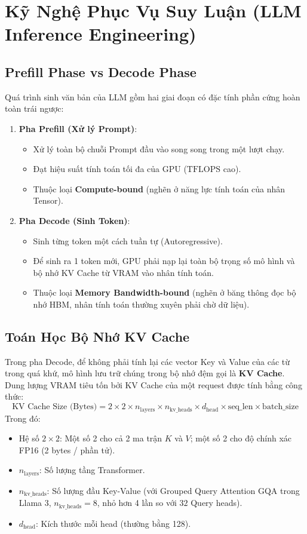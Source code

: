 \section{Kỹ Nghệ Phục Vụ Suy Luận (LLM Inference Engineering)}

\subsection{Prefill Phase vs Decode Phase}
Quá trình sinh văn bản của LLM gồm hai giai đoạn có đặc tính phần cứng hoàn toàn trái ngược:
\begin{enumerate}
    \item \textbf{Pha Prefill (Xử lý Prompt)}:
    \begin{itemize}
        \item Xử lý toàn bộ chuỗi Prompt đầu vào song song trong một lượt chạy.
        \item Đạt hiệu suất tính toán tối đa của GPU ($\text{TFLOPS}$ cao).
        \item Thuộc loại \textbf{Compute-bound} (nghẽn ở năng lực tính toán của nhân Tensor).
    \end{itemize}
    \item \textbf{Pha Decode (Sinh Token)}:
    \begin{itemize}
        \item Sinh từng token một cách tuần tự (Autoregressive).
        \item Để sinh ra 1 token mới, GPU phải nạp lại toàn bộ trọng số mô hình và bộ nhớ KV Cache từ VRAM vào nhân tính toán.
        \item Thuộc loại \textbf{Memory Bandwidth-bound} (nghẽn ở băng thông đọc bộ nhớ HBM, nhân tính toán thường xuyên phải chờ dữ liệu).
    \end{itemize}
\end{enumerate}

\subsection{Toán Học Bộ Nhớ KV Cache}
Trong pha Decode, để không phải tính lại các vector Key và Value của các từ trong quá khứ, mô hình lưu trữ chúng trong bộ nhớ đệm gọi là \textbf{KV Cache}.
Dung lượng VRAM tiêu tốn bởi KV Cache của một request được tính bằng công thức:
\begin{equation}
\text{KV Cache Size (Bytes)} = 2 \times 2 \times n_{\text{layers}} \times n_{\text{kv\_heads}} \times d_{\text{head}} \times \text{seq\_len} \times \text{batch\_size}
\end{equation}
Trong đó:
\begin{itemize}
    \item Hệ số $2 \times 2$: Một số 2 cho cả 2 ma trận $K$ và $V$; một số 2 cho độ chính xác FP16 (2 bytes / phần tử).
    \item $n_{\text{layers}}$: Số lượng tầng Transformer.
    \item $n_{\text{kv\_heads}}$: Số lượng đầu Key-Value (với Grouped Query Attention GQA trong Llama 3, $n_{\text{kv\_heads}} = 8$, nhỏ hơn 4 lần so với $32$ Query heads).
    \item $d_{\text{head}}$: Kích thước mỗi head (thường bằng 128).
\end{itemize}

